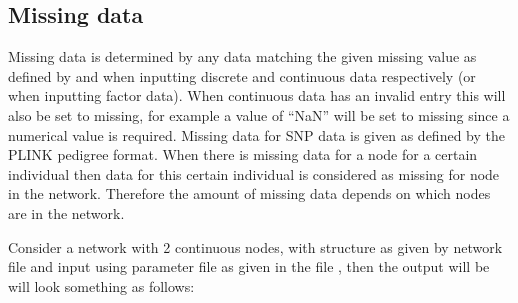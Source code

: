 \documentclass[letterpaper,10pt,english]{sphinxmanual}
\begin{document}
\subsection{Missing data}
\label{\detokenize{input-data:missing-data}}\label{\detokenize{input-data:input-data-missing}}
\sphinxAtStartPar
Missing data is determined by any data matching the given missing value as defined by  and 
when inputting discrete and continuous data respectively (or  when inputting factor data).
When continuous data has an invalid entry this will also be set to missing, for example a value of “NaN” will be set to missing since a numerical value is required.
Missing data for SNP data is given as defined by the PLINK  pedigree format.
When there is missing data for a node for a certain individual then data for this certain individual is considered as missing for  node in the network.
Therefore the amount of missing data depends on which nodes are in the network.

\sphinxAtStartPar
Consider a network with 2 continuous nodes, with structure as given by network file  and input using parameter file 
as given in the file , then the output will be will look something as follows:
\end{document}
